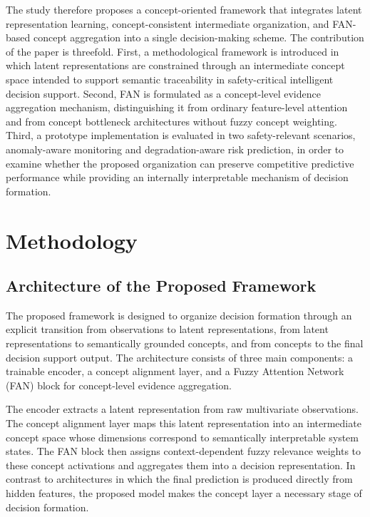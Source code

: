 \documentclass[runningheads]{llncs}
\begin{document}
The study therefore proposes a concept-oriented framework that integrates latent representation learning, concept-consistent intermediate organization, and FAN-based concept aggregation into a single decision-making scheme. The contribution of the paper is threefold. First, a methodological framework is introduced in which latent representations are constrained through an intermediate concept space intended to support semantic traceability in safety-critical intelligent decision support. Second, FAN is formulated as a concept-level evidence aggregation mechanism, distinguishing it from ordinary feature-level attention and from concept bottleneck architectures without fuzzy concept weighting. Third, a prototype implementation is evaluated in two safety-relevant scenarios, anomaly-aware monitoring and degradation-aware risk prediction, in order to examine whether the proposed organization can preserve competitive predictive performance while providing an internally interpretable mechanism of decision formation.



\section{Methodology}

\subsection{Architecture of the Proposed Framework}

The proposed framework is designed to organize decision formation through an explicit transition from observations to latent representations, from latent representations to semantically grounded concepts, and from concepts to the final decision support output. The architecture consists of three main components: a trainable encoder, a concept alignment layer, and a Fuzzy Attention Network (FAN) block for concept-level evidence aggregation.

The encoder extracts a latent representation from raw multivariate observations. The concept alignment layer maps this latent representation into an intermediate concept space whose dimensions correspond to semantically interpretable system states. The FAN block then assigns context-dependent fuzzy relevance weights to these concept activations and aggregates them into a decision representation. In contrast to architectures in which the final prediction is produced directly from hidden features, the proposed model makes the concept layer a necessary stage of decision formation.
\end{document}
